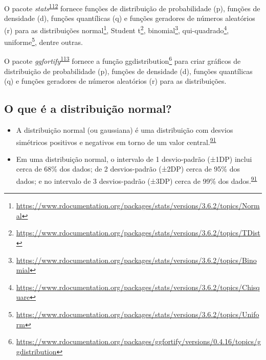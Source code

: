\documentclass[
  a4paper,
]{book}
\renewcommand{\href}[2]{#2\footnote{\url{#1}}}
\newenvironment{infobox}[1]
  {
  \begin{itemize}
  \renewcommand{\labelitemi}{
    \raisebox{-.7\height}[0pt][0pt]{
      {\setkeys{Gin}{width=3em,keepaspectratio}
        \texttt{[image: \#1]}}
    }
  }
  \setlength{\fboxsep}{1em}
  \begin{blackbox}
  \item
  }
  {
  \end{blackbox}
  \end{itemize}
  }
\begin{document}
\begin{infobox}{images/Rlogo}
O pacote \emph{stats}\textsuperscript{\protect\hyperlink{ref-stats-3}{112}} fornece funções de distribuição de probabilidade (p), funções de densidade (d), funções quantílicas (q) e funções geradores de números aleatórios (r) para as distribuições \href{https://www.rdocumentation.org/packages/stats/versions/3.6.2/topics/Normal}{normal}, \href{https://www.rdocumentation.org/packages/stats/versions/3.6.2/topics/TDist}{Student t}, \href{https://www.rdocumentation.org/packages/stats/versions/3.6.2/topics/Binomial}{binomial}, \href{https://www.rdocumentation.org/packages/stats/versions/3.6.2/topics/Chisquare}{qui-quadrado}, \href{https://www.rdocumentation.org/packages/stats/versions/3.6.2/topics/Uniform}{uniforme}, dentre outras.

\end{infobox}

\begin{infobox}{images/Rlogo}
O pacote \emph{ggfortify}\textsuperscript{\protect\hyperlink{ref-ggfortify}{113}} fornece a função \href{https://www.rdocumentation.org/packages/ggfortify/versions/0.4.16/topics/ggdistribution}{ggdistribution} para criar gráficos de distribuição de probabilidade (p), funções de densidade (d), funções quantílicas (q) e funções geradores de números aleatórios (r) para as distribuições.

\end{infobox}

\hypertarget{o-que-uxe9-a-distribuiuxe7uxe3o-normal}{%
\subsection{O que é a distribuição normal?}\label{o-que-uxe9-a-distribuiuxe7uxe3o-normal}}

\begin{itemize}
\item
  A distribuição normal (ou gaussiana) é uma distribuição com desvios simétricos positivos e negativos em torno de um valor central.\textsuperscript{\protect\hyperlink{ref-Ali2016}{91}}
\item
  Em uma distribuição normal, o intervalo de 1 desvio-padrão (±1DP) inclui cerca de 68\% dos dados; de 2 desvios-padrão (±2DP) cerca de 95\% dos dados; e no intervalo de 3 desvios-padrão (±3DP) cerca de 99\% dos dados.\textsuperscript{\protect\hyperlink{ref-Ali2016}{91}}
\end{itemize}
\end{document}
